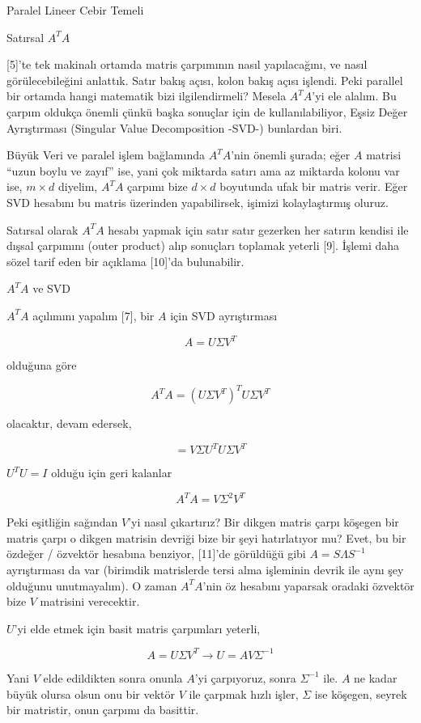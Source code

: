 \documentclass[12pt,fleqn]{article}\usepackage{../../common}
\begin{document}
Paralel Lineer Cebir Temeli

Satırsal $A^TA$

[5]'te tek makinalı ortamda matris çarpımının nasıl yapılacağını, ve nasıl
görülecebileğini anlattık. Satır bakış açısı, kolon bakış açısı işlendi. Peki
parallel bir ortamda hangi matematik bizi ilgilendirmeli? Mesela $A^TA$'yi ele
alalım. Bu çarpım oldukça önemli çünkü başka sonuçlar için de kullanılabiliyor,
Eşsiz Değer Ayrıştırması (Singular Value Decomposition -SVD-) bunlardan biri.

Büyük Veri ve paralel işlem bağlamında $A^TA$'nin önemli şurada; eğer $A$
matrisi ``uzun boylu ve zayıf'' ise, yani çok miktarda satırı ama az miktarda
kolonu var ise, $m \times d$ diyelim, $A^TA$ çarpımı bize $d \times d$ boyutunda
ufak bir matris verir. Eğer SVD hesabını bu matris üzerinden yapabilirsek,
işimizi kolaylaştırmış oluruz. 

Satırsal olarak $A^TA$ hesabı yapmak için satır satır gezerken her satırın
kendisi ile dışsal çarpımını (outer product) alıp sonuçları toplamak yeterli
[9]. İşlemi daha sözel tarif eden bir açıklama [10]'da bulunabilir.

$A^TA$ ve SVD

$A^TA$ açılımını yapalım [7], bir $A$ için SVD ayrıştırması

$$
A = U \Sigma V^T
$$

olduğuna göre

$$
A^TA =  (U \Sigma V^T)^T  U \Sigma V^T
$$

olacaktır, devam edersek,

$$
= V \Sigma U^T U \Sigma V^T 
$$

$U^T U = I$ olduğu için geri kalanlar

$$
A^TA = V \Sigma^2 V^T 
$$

Peki eşitliğin sağından $V$'yi nasıl çıkartırız? Bir dikgen matris çarpı köşegen
bir matris çarpı o dikgen matrisin devriği bize bir şeyi hatırlatıyor mu?  Evet,
bu bir özdeğer / özvektör hesabına benziyor, [11]'de görüldüğü gibi $A=S\Lambda
S^{-1}$ ayrıştırması da var (birimdik matrislerde tersi alma işleminin devrik
ile aynı şey olduğunu unutmayalım). O zaman $A^TA$'nin öz hesabını yaparsak
oradaki özvektör bize $V$ matrisini verecektir.

$U$'yi elde etmek için basit matris çarpımları yeterli,

$$
A = U \Sigma V^T \to U = A V \Sigma^{-1}
$$

Yani $V$ elde edildikten sonra onunla $A$'yi çarpıyoruz, sonra $\Sigma^{-1}$
ile. $A$ ne kadar büyük olursa olsun onu bir vektör $V$ ile çarpmak hızlı
işler, $\Sigma$ ise köşegen, seyrek bir matristir, onun çarpımı da basittir.
\end{document}
